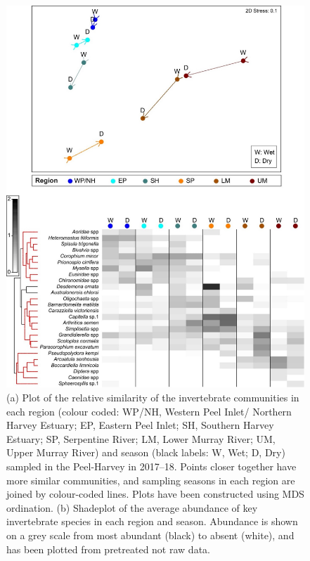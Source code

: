 \documentclass[
]{book}
\begin{document}
\begin{figure}
\includegraphics[width=1\linewidth]{images/BMI/picture10} \caption{(a) Plot of the relative similarity of the invertebrate communities in each region (colour coded: WP/NH, Western Peel Inlet/ Northern Harvey Estuary; EP, Eastern Peel Inlet; SH, Southern Harvey Estuary; SP, Serpentine River; LM, Lower Murray River; UM, Upper Murray River) and season (black labels: W, Wet; D, Dry) sampled in the Peel-Harvey in 2017–18. Points closer together have more similar communities, and sampling seasons in each region are joined by colour-coded lines. Plots have been constructed using MDS ordination. (b) Shadeplot of the average abundance of key invertebrate species in each region and season. Abundance is shown on a grey scale from most abundant (black) to absent (white), and has been plotted from pretreated not raw data.}\label{fig:BMI-pic10}
\end{figure}
\end{document}
